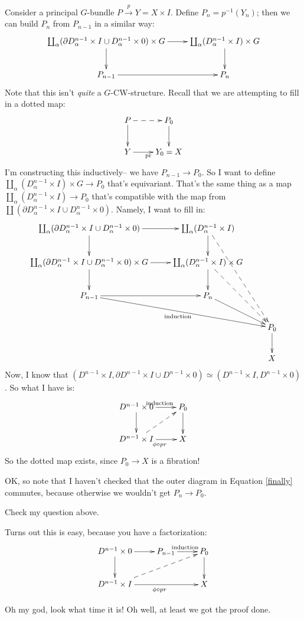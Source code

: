 Consider a principal $G$-bundle $P\xrightarrow{p}Y = X\times I$. Define $P_n =
p^{-1}(Y_n)$; then we can build $P_n$ from $P_{n-1}$ in a similar way:
\begin{equation*}
    \xymatrix{
	\coprod_\alpha(\partial D^{n-1}_\alpha\times I\cup D^{n-1}_\alpha\times
	0)\times G\ar[r]\ar[d] & \coprod_\alpha (D^{n-1}_\alpha\times I)\times
	G\ar[d]\\
	P_{n-1}\ar[r] & P_n
    }
\end{equation*}
Note that this isn't \emph{quite} a $G$-CW-structure. Recall that we are
attempting to fill in a dotted map:
\begin{equation*}
    \xymatrix{
	P\ar@{-->}[r]\ar[d] & P_0\ar[d]\\
	Y\ar[r]_{\pr} & Y_0 = X
    }
\end{equation*}
I'm constructing this inductively-- we have $P_{n-1}\to P_0$. So I want to define $\coprod_\alpha(D^{n-1}_\alpha\times I)\times G\to P_0$ that's equivariant. That's the same thing as a map $\coprod_\alpha (D^{n-1}_\alpha\times I)\to P_0$ that's compatible with the map from $\coprod(\partial D^{n-1}_\alpha\times I\cup D^{n-1}_\alpha\times 0)$. Namely, I want to fill in:
\begin{equation}\label{finally}
    \xymatrix{
	\coprod_\alpha (\partial D^{n-1}_\alpha\times I\cup D^{n-1}_\alpha\times 0)\ar[r]\ar[d] & \coprod_\alpha(D^{n-1}_\alpha\times I)\ar@{-->}[dddr]\ar[d] & \\
	\coprod_\alpha(\partial D^{n-1}_\alpha\times I\cup D^{n-1}_\alpha\times 0)\times G\ar[r]\ar[d] & \coprod_\alpha (D^{n-1}_\alpha\times I)\times G\ar@{-->}[ddr]\ar[d] & \\
	P_{n-1}\ar[drr]_{\mathrm{induction}}\ar[r] & P_n\ar[dr] & \\
	& & P_0\ar[d]\\
	& & X
    }
\end{equation}
Now, I know that $(D^{n-1}\times I,\partial D^{n-1}\times I\cup D^{n-1}\times 0)\simeq (D^{n-1}\times I,D^{n-1}\times 0)$. So what I have is:
\begin{equation*}
    \xymatrix{
	D^{n-1}\times 0\ar[d]\ar[r]^{\mathrm{induction}} & P_0\ar[d]\\
	D^{n-1}\times I\ar[r]_{\phi\circ pr}\ar@{-->}[ur] & X
    }
\end{equation*}
So the dotted map exists, since $P_0\to X$ is a fibration!

OK, so note that I haven't checked that the outer diagram in Equation \ref{finally} commutes, because otherwise we wouldn't get $P_n\to P_0$.
\begin{exercise}
    Check my question above.
    
    Turns out this is easy, because you have a factorization:
\begin{equation*}
    \xymatrix{
	D^{n-1}\times 0\ar[d]\ar[r] & P_{n-1}\ar[r]^{\mathrm{induction}} & P_0\ar[d]\\
	D^{n-1}\times I\ar[rr]_{\phi\circ pr}\ar@{-->}[urr] & & X
    }
\end{equation*}
\end{exercise}
Oh my god, look what time it is! Oh well, at least we got the proof done.
